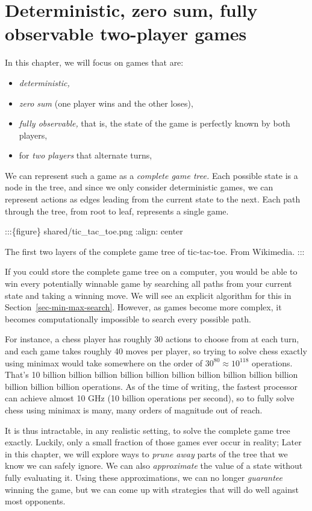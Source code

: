 \documentclass[
  letterpaper,
  DIV=11,
  numbers=noendperiod]{scrreprt}
\providecommand{\tightlist}{%
  \setlength{\itemsep}{0pt}\setlength{\parskip}{0pt}}\usepackage{longtable,booktabs,array}
\theoremstyle{plain}
\theoremstyle{plain}
\theoremstyle{definition}
\theoremstyle{definition}
\theoremstyle{remark}
\begin{document}
\section{Deterministic, zero sum, fully observable two-player
games}\label{deterministic-zero-sum-fully-observable-two-player-games}

In this chapter, we will focus on games that are:

\begin{itemize}
\tightlist
\item
  \emph{deterministic,}
\item
  \emph{zero sum} (one player wins and the other loses),
\item
  \emph{fully observable,} that is, the state of the game is perfectly
  known by both players,
\item
  for \emph{two players} that alternate turns,
\end{itemize}

We can represent such a game as a \emph{complete game tree.} Each
possible state is a node in the tree, and since we only consider
deterministic games, we can represent actions as edges leading from the
current state to the next. Each path through the tree, from root to
leaf, represents a single game.

:::\{figure\} shared/tic\_tac\_toe.png :align: center

The first two layers of the complete game tree of tic-tac-toe. From
Wikimedia. :::

If you could store the complete game tree on a computer, you would be
able to win every potentially winnable game by searching all paths from
your current state and taking a winning move. We will see an explicit
algorithm for this in Section~\ref{sec-min-max-search}. However, as
games become more complex, it becomes computationally impossible to
search every possible path.

For instance, a chess player has roughly 30 actions to choose from at
each turn, and each game takes roughly 40 moves per player, so trying to
solve chess exactly using minimax would take somewhere on the order of
\(30^{80} \approx 10^{118}\) operations. That's 10 billion billion
billion billion billion billion billion billion billion billion billion
billion billion operations. As of the time of writing, the fastest
processor can achieve almost 10 GHz (10 billion operations per second),
so to fully solve chess using minimax is many, many orders of magnitude
out of reach.

It is thus intractable, in any realistic setting, to solve the complete
game tree exactly. Luckily, only a small fraction of those games ever
occur in reality; Later in this chapter, we will explore ways to
\emph{prune away} parts of the tree that we know we can safely ignore.
We can also \emph{approximate} the value of a state without fully
evaluating it. Using these approximations, we can no longer
\emph{guarantee} winning the game, but we can come up with strategies
that will do well against most opponents.
\end{document}

